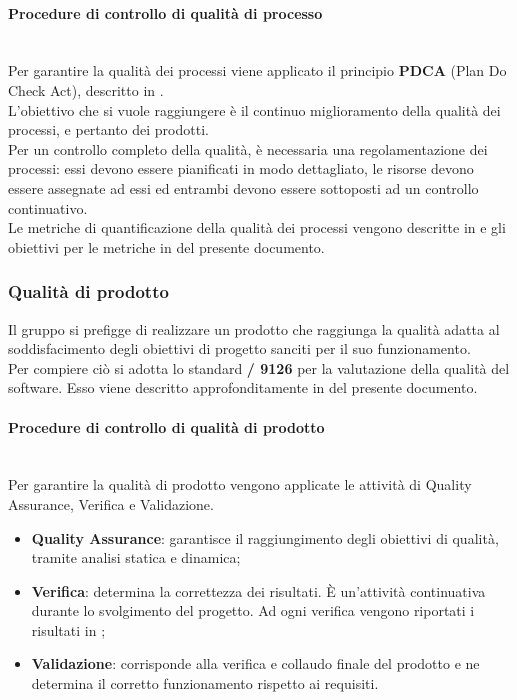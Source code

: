\paragraph{Procedure di controllo di qualità di processo}\mbox{}\\
Per garantire la qualità dei processi viene applicato il principio \textbf{PDCA} (Plan Do Check Act), descritto in .\\ 
L'obiettivo che si vuole raggiungere è il continuo miglioramento della qualità dei processi, e pertanto dei prodotti.\\
Per un controllo completo della qualità, è necessaria una regolamentazione dei processi: essi devono essere pianificati in modo dettagliato, le risorse devono essere assegnate ad essi ed entrambi devono essere sottoposti ad un controllo continuativo.\\
Le metriche di quantificazione della qualità dei processi vengono descritte in \NormeDiProgetto{} e gli obiettivi per le metriche in  del presente documento.

\subsubsection{Qualità di prodotto}
Il gruppo si prefigge di realizzare un prodotto che raggiunga la qualità adatta al soddisfacimento degli obiettivi di progetto sanciti per il suo funzionamento.\\
Per compiere ciò si adotta lo standard \textbf{/ 9126} per la valutazione della qualità del software. Esso viene descritto approfonditamente in  del presente documento.

\paragraph{Procedure di controllo di qualità di prodotto}\mbox{}\\
Per garantire la qualità di prodotto vengono applicate le attività di Quality Assurance, Verifica e Validazione.
\begin{itemize}
	\item \textbf{Quality Assurance}: garantisce il raggiungimento degli obiettivi di qualità, tramite analisi statica e dinamica;
	\item \textbf{Verifica}: determina la correttezza dei risultati. \`{E} un’attività continuativa durante lo svolgimento del progetto. Ad ogni verifica vengono riportati i risultati in ;
	\item \textbf{Validazione}: corrisponde alla verifica e collaudo finale del prodotto e ne determina il corretto funzionamento rispetto ai requisiti.
\end{itemize}

